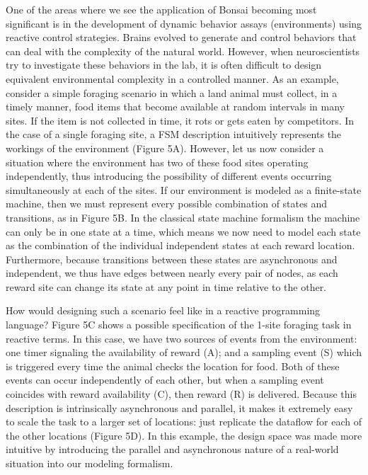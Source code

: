 One of the areas where we see the application of Bonsai becoming most significant is in the development of dynamic behavior assays (environments) using reactive control strategies. Brains evolved to generate and control behaviors that can deal with the complexity of the natural world. However, when neuroscientists try to investigate these behaviors in the lab, it is often difficult to design equivalent environmental complexity in a controlled manner. As an example, consider a simple foraging scenario in which a land animal must collect, in a timely manner, food items that become available at random intervals in many sites. If the item is not collected in time, it rots or gets eaten by competitors. In the case of a single foraging site, a FSM description intuitively represents the workings of the environment (Figure 5A). However, let us now consider a situation where the environment has two of these food sites operating independently, thus introducing the possibility of different events occurring simultaneously at each of the sites. If our environment is modeled as a finite-state machine, then we must represent every possible combination of states and transitions, as in Figure 5B. In the classical state machine formalism the machine can only be in one state at a time, which means we now need to model each state as the combination of the individual independent states at each reward location. Furthermore, because transitions between these states are asynchronous and independent, we thus have edges between nearly every pair of nodes, as each reward site can change its state at any point in time relative to the other.

How would designing such a scenario feel like in a reactive programming language? Figure 5C shows a possible specification of the 1-site foraging task in reactive terms. In this case, we have two sources of events from the environment: one timer signaling the availability of reward (A); and a sampling event (S) which is triggered every time the animal checks the location for food. Both of these events can occur independently of each other, but when a sampling event coincides with reward availability (C), then reward (R) is delivered. Because this description is intrinsically asynchronous and parallel, it makes it extremely easy to scale the task to a larger set of locations: just replicate the dataflow for each of the other locations (Figure 5D). In this example, the design space was made more intuitive by introducing the parallel and asynchronous nature of a real-world situation into our modeling formalism.

